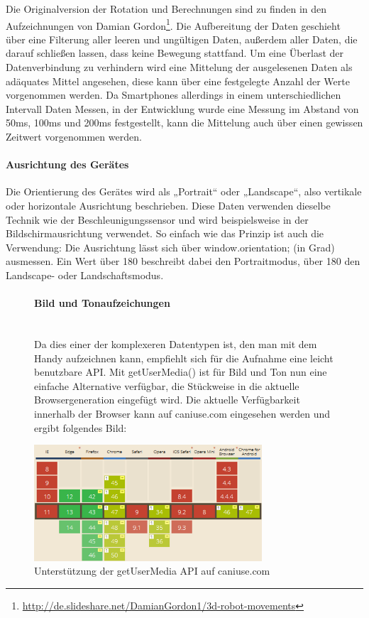 \documentclass[a4paper]{spie}  %
\begin{document}
Die Originalversion der Rotation und Berechnungen sind zu finden in den Aufzeichnungen von Damian Gordon\footnote{\url{http://de.slideshare.net/DamianGordon1/3d-robot-movements}}.
Die Aufbereitung der Daten geschieht über eine Filterung aller leeren und ungültigen Daten, außerdem aller Daten, die darauf schließen lassen, dass keine Bewegung stattfand. Um eine Überlast der Datenverbindung zu verhindern wird eine Mittelung der ausgelesenen Daten als adäquates Mittel angesehen, diese kann über eine festgelegte Anzahl der Werte vorgenommen werden. Da Smartphones allerdings in einem unterschiedlichen Intervall Daten Messen, in der Entwicklung wurde eine Messung im Abstand von 50ms, 100ms und 200ms festgestellt, kann die Mittelung auch über einen gewissen Zeitwert vorgenommen werden.

\paragraph{Ausrichtung des Gerätes}
Die Orientierung des Gerätes wird als „Portrait“ oder „Landscape“, also vertikale oder horizontale Ausrichtung beschrieben. Diese Daten verwenden dieselbe Technik wie der Beschleunigungssensor und wird beispielsweise in der Bildschirmausrichtung verwendet. So einfach wie das Prinzip ist auch die Verwendung: Die Ausrichtung lässt sich über window.orientation; (in Grad) ausmessen. Ein Wert über 180 beschreibt dabei den Portraitmodus, über 180 den Landscape- oder Landschaftsmodus.


\begin{figure}[H]
\begin{minipage}[t]{0.4\textwidth}
\vspace{0pt}
\paragraph{Bild und Tonaufzeichungen}\mbox{}\\
Da dies einer der komplexeren Datentypen ist, den man mit dem Handy aufzeichnen kann, empfiehlt sich für die Aufnahme eine leicht benutzbare API. Mit getUserMedia() ist für Bild und Ton nun eine einfache Alternative verfügbar, die Stückweise in die aktuelle Browsergeneration eingefügt wird. Die aktuelle Verfügbarkeit innerhalb der Browser kann auf caniuse.com eingesehen werden und ergibt folgendes Bild:

\end{minipage}
\hfill
\begin{minipage}[t]{0.5\textwidth}
\vspace{0pt}
    \includegraphics[width=8.5cm]{images/caniuseGetUserMedia}
     \caption{Unterstützung der getUserMedia API auf caniuse.com}
		\label{fig:test2}
\end{minipage}
\end{figure}
\end{document}
